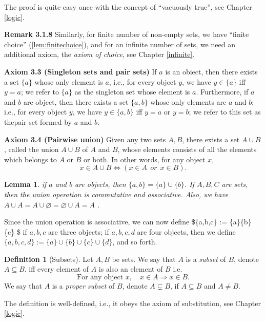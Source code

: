 \documentclass[
]{book}
\newtheorem{lemma}{Lemma}[chapter]
\theoremstyle{definition}
\newtheorem{definition}{Definition}[chapter]
\theoremstyle{definition}
\theoremstyle{definition}
\theoremstyle{definition}
\theoremstyle{remark}
\begin{document}
The proof is quite easy once with the concept of ``vacuously true'', see Chapter \ref{logic}.

\textbf{Remark 3.1.8} Similarly, for finite number of non-empty sets, we have ``finite choice'' (\ref{lem:finitechoice}), and for an infinite number of sets, we need an additional axiom, the \emph{axiom of choice}, see Chapter \ref{infinite}.

\textbf{Axiom 3.3 (Singleton sets and pair sets)} If \(a\) is an obiect, then there exists a set \(\{a\}\) whose only element is \(a\), i.e., for every object \(y\), we have \(y \in \{a\}\) iff \(y = a\); we refer to \(\{a\}\) as the singleton set whose element is \(a\). Furthermore, if \(a\) and \(b\) are object, then there exists a set \(\{a,b\}\) whose only elements are \(a\) and \(b\); i.e., for every object \(y\), we have \(y\in \{a,b\}\) iff \(y=a\) or \(y=b\); we refer to this set as thepair set formed by \(a\) and \(b\).

\textbf{Axiom 3.4 (Pairwise union)} Given any two sets \(A,B\), there exists a set \(A\cup B\), called the union \(A\cup B\) of \(A\) and \(B\), whose elements consists of all the elements which belongs to \(A\) or \(B\) or both. In other words, for any object \(x\),
\[
x\in A\cup B \iff (x\in A\ \ or\ \ x\in B ).
\]

\begin{lemma}
if \(a\) and \(b\) are objects, then \(\{a,b\} =\{a\} \cup \{b\}\). If \(A,B,C\) are sets, then the union operation is commutative and associative. Also, we have \(A\cup A = A\cup \varnothing = \varnothing \cup A = A\) .
\end{lemma}

Since the union operation is associative, we can now define \$\{a,b,c\} := \{a\}\cup \{b\} \cup \{c\} \$ if \(a,b,c\) are three objects; if \(a,b,c,d\) are four objects, then we define \(\{a,b,c,d\} := \{a\}\cup \{b\} \cup \{c\} \cup \{d\}\), and so forth.

\begin{definition}[Subsets]
Let \(A,B\) be sets. We say that \(A\) is a \emph{subset} of \(B\), denote \(A\subseteq B\). iff every element of \(A\) is also an element of \(B\) i.e.
\[
\text{For any object }x,\quad x\in A \Longrightarrow x\in B.
\]
We say that \(A\) is a \emph{proper subset} of \(B\), denote \(A \subsetneq B\), if \(A \subseteq B\) and \(A\ne B\).
\end{definition}

The definition is well-defined, i.e., it obeys the axiom of substitution, see Chapter \ref{logic}.
\end{document}
